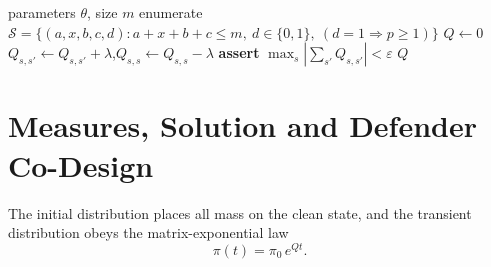 \documentclass[journal]{IEEEtran}
\begin{document}
\begin{table}[t]
\caption{Default parameters.}
\label{tab:params}
\centering\footnotesize

\end{table}

\begin{algorithm}[t]
\caption{CRADLE generator synthesis}
\label{alg:gen}
\begin{algorithmic}[1]
\REQUIRE parameters $\theta$, size $m$
\STATE enumerate $\mathcal{S}=\{(a,x,b,c,d): a{+}x{+}b{+}c\le m,\ d\in\{0,1\},\
(d{=}1\Rightarrow p\ge1)\}$
\STATE $Q\gets 0$
    \STATE $Q_{s,s'}\gets Q_{s,s'}+\lambda$,\quad $Q_{s,s}\gets Q_{s,s}-\lambda$
  \ENDFOR
\ENDFOR
\STATE \textbf{assert} $\max_s|\sum_{s'}Q_{s,s'}|<\varepsilon$
\RETURN $Q$
\end{algorithmic}
\end{algorithm}

\section{Measures, Solution and Defender Co-Design}\label{sec:measures}
The initial distribution places all mass on the clean state, and the transient
distribution obeys the matrix-exponential law
\begin{equation}
\pi(t)=\pi_0\,e^{Qt}.
\label{eq:transient}
\end{equation}
\end{document}
